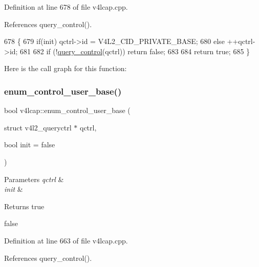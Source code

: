 Definition at line 678 of file v4lcap.\+cpp.



References query\+\_\+control().


\begin{DoxyCode}
678                                                                                \{
679     \textcolor{keywordflow}{if}(init) qctrl->id = V4L2\_CID\_PRIVATE\_BASE;
680     \textcolor{keywordflow}{else} ++qctrl->id;
681 
682     \textcolor{keywordflow}{if} (!\hyperlink{classv4lcap_acede842207240d9eb3b4a8d99ff32fc4}{query\_control}(qctrl)) \textcolor{keywordflow}{return} \textcolor{keyword}{false};
683 
684     \textcolor{keywordflow}{return} \textcolor{keyword}{true};
685 \}
\end{DoxyCode}
Here is the call graph for this function\+:
\mbox{\label{classv4lcap_a5ebdba4ccfce2572c143e6a291ef17ae}} 
\subsubsection{\texorpdfstring{enum\+\_\+control\+\_\+user\+\_\+base()}{enum\_control\_user\_base()}}
{\footnotesize\ttfamily bool v4lcap\+::enum\+\_\+control\+\_\+user\+\_\+base (\begin{DoxyParamCaption}\item[{struct v4l2\+\_\+queryctrl $\ast$}]{qctrl,  }\item[{bool}]{init = {\ttfamily false} }\end{DoxyParamCaption})}


\begin{DoxyParams}{Parameters}
{\em qctrl} & \\
\hline
{\em init} & \\
\hline
\end{DoxyParams}
\begin{DoxyReturn}{Returns}
true 

false 
\end{DoxyReturn}


Definition at line 663 of file v4lcap.\+cpp.



References query\+\_\+control().


